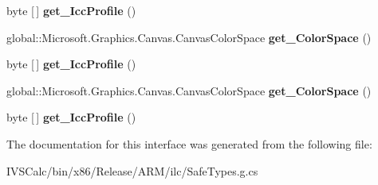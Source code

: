 \begin{DoxyCompactItemize}
byte \mbox{[}$\,$\mbox{]} {\bfseries get\+\_\+\+Icc\+Profile} ()
\item 
\mbox{\label{interface_microsoft_1_1_graphics_1_1_canvas_1_1_effects_1_1_i_color_management_profile_ac4f9b5e1a6c94ab3e67b784d03dc51db}} 
global\+::\+Microsoft.\+Graphics.\+Canvas.\+Canvas\+Color\+Space {\bfseries get\+\_\+\+Color\+Space} ()
\item 
\mbox{\label{interface_microsoft_1_1_graphics_1_1_canvas_1_1_effects_1_1_i_color_management_profile_a870533e5ac9edd36e427de0150e855bf}} 
byte \mbox{[}$\,$\mbox{]} {\bfseries get\+\_\+\+Icc\+Profile} ()
\item 
\mbox{\label{interface_microsoft_1_1_graphics_1_1_canvas_1_1_effects_1_1_i_color_management_profile_ac4f9b5e1a6c94ab3e67b784d03dc51db}} 
global\+::\+Microsoft.\+Graphics.\+Canvas.\+Canvas\+Color\+Space {\bfseries get\+\_\+\+Color\+Space} ()
\item 
\mbox{\label{interface_microsoft_1_1_graphics_1_1_canvas_1_1_effects_1_1_i_color_management_profile_a870533e5ac9edd36e427de0150e855bf}} 
byte \mbox{[}$\,$\mbox{]} {\bfseries get\+\_\+\+Icc\+Profile} ()
\end{DoxyCompactItemize}


The documentation for this interface was generated from the following file\+:\begin{DoxyCompactItemize}
\item 
I\+V\+S\+Calc/bin/x86/\+Release/\+A\+R\+M/ilc/Safe\+Types.\+g.\+cs\end{DoxyCompactItemize}

